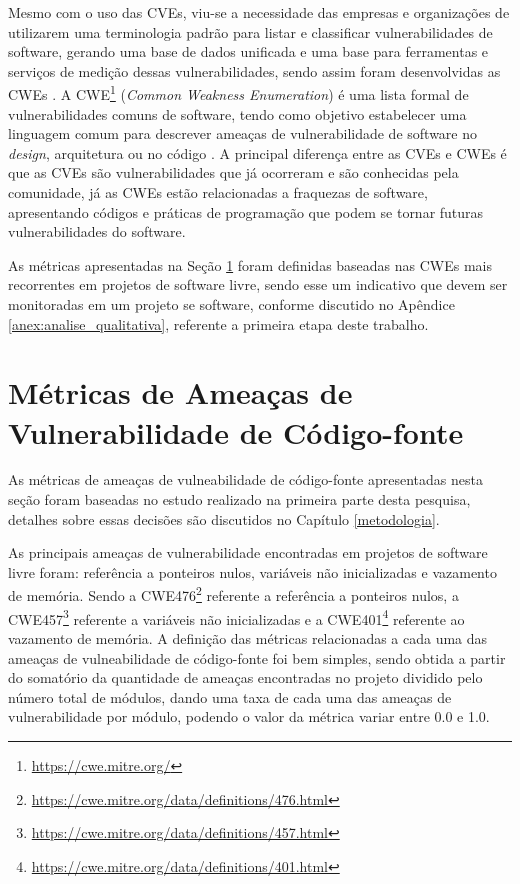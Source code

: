 Mesmo com o uso das CVEs, viu-se a necessidade das empresas e organizações de
utilizarem uma terminologia padrão para listar e classificar vulnerabilidades de
software, gerando uma base de dados unificada e uma base para ferramentas e
serviços de medição dessas vulnerabilidades, sendo assim foram desenvolvidas as
CWEs \cite{arthur&carlos2014}. A CWE\footnote{\url{https://cwe.mitre.org/}}
(\textit{Common Weakness Enumeration}) é uma lista formal de vulnerabilidades
comuns de software, tendo como objetivo estabelecer uma linguagem comum para
descrever ameaças de vulnerabilidade de software no \textit{design}, arquitetura
ou no código \cite{arthur&carlos2014}.  A principal diferença entre as CVEs e
CWEs é que as CVEs são vulnerabilidades que já ocorreram e são conhecidas pela
comunidade, já as CWEs estão relacionadas a fraquezas de software, apresentando
códigos e práticas de programação que podem se tornar futuras vulnerabilidades
do software.

As métricas apresentadas na Seção \ref{metricasvulnerabilidade} foram definidas
baseadas nas CWEs mais recorrentes em projetos de software livre, sendo esse um
indicativo que devem ser monitoradas em um projeto se software, conforme
discutido no Apêndice \ref{anex:analise_qualitativa}, referente a primeira etapa
deste trabalho.

\section{Métricas de Ameaças de Vulnerabilidade de Código-fonte}\label{metricasvulnerabilidade}

As métricas de ameaças de vulneabilidade de código-fonte apresentadas nesta
seção foram baseadas no estudo realizado na primeira parte desta pesquisa,
detalhes sobre essas decisões são discutidos no Capítulo \ref{metodologia}.

As principais ameaças de vulnerabilidade encontradas em projetos de software
livre foram: referência a ponteiros nulos, variáveis não inicializadas e
vazamento de memória. Sendo a
CWE476\footnote{\url{https://cwe.mitre.org/data/definitions/476.html}} referente
a referência a ponteiros nulos, a
CWE457\footnote{\url{https://cwe.mitre.org/data/definitions/457.html}} referente
a variáveis não inicializadas e a
CWE401\footnote{\url{https://cwe.mitre.org/data/definitions/401.html}} referente
ao vazamento de memória. A definição das métricas relacionadas a cada uma das
ameaças de vulneabilidade de código-fonte foi bem simples, sendo obtida a partir
do somatório da quantidade de ameaças encontradas no projeto dividido pelo
número total de módulos, dando uma taxa de cada uma das ameaças de
vulnerabilidade por módulo, podendo o valor da métrica variar entre 0.0 e 1.0.

